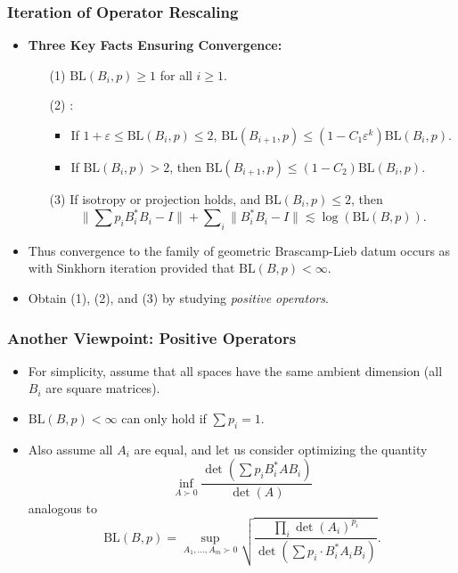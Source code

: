 \documentclass[usenames,dvipsnames,12pt]{beamer}
\begin{document}
\begin{frame}
    \frametitle{Iteration of Operator Rescaling}

    \begin{itemize}
        \item {\bf Three Key Facts Ensuring Convergence:}
        \begin{itemize}
            \pause
            \item[(1)] $\text{BL}(B_i,p) \geq 1$ for all $i \geq 1$.
            \pause
            \item[(2)]:

            \begin{itemize}
                \item If $1 + \varepsilon \leq \text{BL}(B_i,p) \leq 2$, $\text{BL}(B_{i+1},p) \leq (1 - C_1 \varepsilon^k) \text{BL}(B_i,p)$.

                \item If $\text{BL}(B_i,p) > 2$, then $\text{BL}(B_{i+1},p) \leq (1 - C_2) \text{BL}(B_i,p)$.
            \end{itemize}

            \pause
            \item[(3)] If isotropy or projection holds, and $\text{BL}(B_i,p) \leq 2$, then
            \[ \| \sum p_i B_i^* B_i - I \| + \sum\nolimits_i \| B_i^* B_i - I \| \lesssim \log(\text{BL}(B,p)). \]
        \end{itemize}

        \pause
        \item Thus convergence to the family of geometric Brascamp-Lieb datum occurs as with Sinkhorn iteration provided that $\text{BL}(B,p) < \infty$.

        \pause
        \item Obtain (1), (2), and (3) by studying \emph{positive operators}.
    \end{itemize}

\end{frame}


\begin{frame}
    \frametitle{Another Viewpoint: Positive Operators}

    \begin{itemize}
        \item For simplicity, assume that all spaces have the same ambient dimension (all $B_i$ are square matrices). 

        \pause
        \item $\text{BL}(B,p) < \infty$ can only hold if $\sum p_i = 1$.

        \pause
        \item Also assume all $A_i$ are equal, and let us consider optimizing the quantity
        \[ \inf_{A \succ 0} \frac{\det(\sum p_i B_i^* A B_i)}{\det(A)}  \]
        analogous to
        \[ \text{BL}(B,p) = \sup_{A_1,\dots,A_m \succ 0} \sqrt{ \frac{\prod_i \det(A_i)^{p_i}}{\det(\sum p_i \cdot B_i^* A_i B_i)}}. \]
    \end{itemize}
\end{frame}
\end{document}
